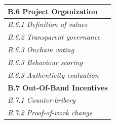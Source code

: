 \documentclass[12pt,a4paper]{article}
\begin{document}
\begin{tabular}{| l |}
  \textbf{B.6 Project Organization}\\
  \hline
  \textit{B.6.1 Definition of values}\\
  \hline
  \textit{B.6.2 Transparent governance}\\
  \hline
  \textit{B.6.3 Onchain voting}\\
  \hline
  \textit{B.6.3 Behaviour scoring}\\
  \hline
  \textit{B.6.3 Authenticity evaluation}\\
  \hline

  \textbf{B.7 Out-Of-Band Incentives}\\
  \hline
  \textit{B.7.1 Counter-bribery}\\
  \hline
  \textit{B.7.2 Proof-of-work change}\\
  \hline

\end{tabular}
\end{document}
